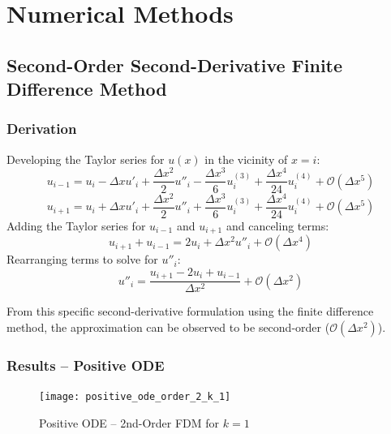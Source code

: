 \documentclass[10pt, reqno]{article}		%
\numberwithin{equation}{section}
\begin{document}
\newpage

\section{Numerical Methods}

\subsection{Second-Order Second-Derivative Finite Difference Method}

\subsubsection{Derivation}

Developing the Taylor series for $u(x)$ in the vicinity of $x = i$:
\begin{equation}
u_{i-1} = u_i - \Delta x u'_i + \frac{\Delta x^2}{2} u''_i - \frac{\Delta x^3}{6} u^{(3)}_i + \frac{\Delta x^4}{24} u^{(4)}_i + \mathcal{O}(\Delta x^5)
\end{equation}
\begin{equation}
u_{i+1} = u_i + \Delta x u'_i + \frac{\Delta x^2}{2} u''_i + \frac{\Delta x^3}{6} u^{(3)}_i + \frac{\Delta x^4}{24} u^{(4)}_i + \mathcal{O}(\Delta x^5)
\end{equation}
Adding the Taylor series for $u_{i-1}$ and $u_{i+1}$ and canceling terms:
\begin{equation}
u_{i+1} + u_{i-1} = 2u_i + \Delta x^2 u''_i + \mathcal{O}(\Delta x^4)
\end{equation}
Rearranging terms to solve for $u''_i$:
\begin{equation}
u''_i = \frac{u_{i+1} - 2u_i + u_{i-1}}{\Delta x^2} + \mathcal{O}(\Delta x^2) 
\end{equation}

From this specific second-derivative formulation using the finite difference method, the approximation can be observed to be second-order ($\mathcal{O}(\Delta x^2)$).

\subsubsection{Results -- Positive ODE}

\begin{figure}[H]
	\begin{center}
		\texttt{[image: positive\_ode\_order\_2\_k\_1]}
		\caption{Positive ODE -- 2nd-Order FDM for $k = 1$}
	\end{center}
\end{figure}
\end{document}

